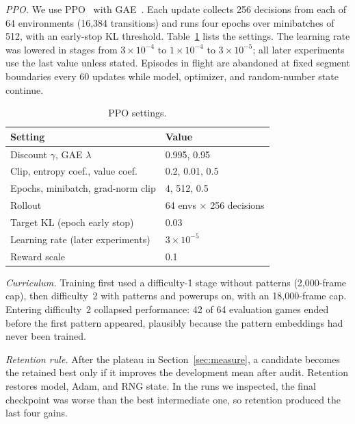 \documentclass[journal]{IEEEtran}
\begin{document}
\textit{PPO.} We use PPO~\cite{schulman2017ppo} with GAE~\cite{schulman2016gae}. Each update collects 256 decisions from each of 64 environments (16{,}384 transitions) and runs four epochs over minibatches of 512, with an early-stop KL threshold. Table~\ref{tab:ppo} lists the settings. The learning rate was lowered in stages from $3\times10^{-4}$ to $1\times10^{-4}$ to $3\times10^{-5}$; all later experiments use the last value unless stated. Episodes in flight are abandoned at fixed segment boundaries every 60 updates while model, optimizer, and random-number state continue.

\begin{table}[t]
\caption{PPO settings.}\label{tab:ppo}
\centering
\small
\begin{tabular}{@{}ll@{}}
\toprule
Setting & Value \\
\midrule
Discount $\gamma$, GAE $\lambda$ & 0.995, 0.95 \\
Clip, entropy coef., value coef. & 0.2, 0.01, 0.5 \\
Epochs, minibatch, grad-norm clip & 4, 512, 0.5 \\
Rollout & 64 envs $\times$ 256 decisions \\
Target KL (epoch early stop) & 0.03 \\
Learning rate (later experiments) & $3\times10^{-5}$ \\
Reward scale & 0.1 \\
\bottomrule
\end{tabular}
\end{table}

\textit{Curriculum.} Training first used a difficulty-1 stage without patterns (2{,}000-frame cap), then difficulty~2 with patterns and powerups on, with an 18{,}000-frame cap. Entering difficulty~2 collapsed performance: 42 of 64 evaluation games ended before the first pattern appeared, plausibly because the pattern embeddings had never been trained.

\textit{Retention rule.} After the plateau in Section~\ref{sec:measure}, a candidate becomes the retained best only if it improves the development mean after audit. Retention restores model, Adam, and RNG state. In the runs we inspected, the final checkpoint was worse than the best intermediate one, so retention produced the last four gains.
\end{document}
